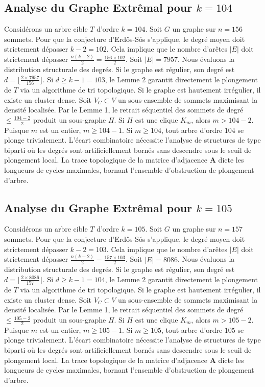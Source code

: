 \documentclass[11pt,a4paper]{article}
\begin{document}
\subsection{Analyse du Graphe Extr\^emal pour $k=104$}
Consid\'erons un arbre cible $T$ d'ordre $k=104$.
Soit $G$ un graphe sur $n=156$ sommets.
Pour que la conjecture d'Erd\H{o}s-S\'os s'applique, le degr\'e moyen doit strictement d\'epasser $k-2 = 102$.
Cela implique que le nombre d'ar\^etes $|E|$ doit strictement d\'epasser $\frac{n(k-2)}{2} = \frac{156 \times 102}{2}$.
Soit $|E| = 7957$.
Nous \'evaluons la distribution structurale des degr\'es. Si le graphe est r\'egulier, son degr\'e est $d = \lfloor \frac{2 \times 7957}{156} \rfloor$.
Si $d \geq k-1 = 103$, le Lemme 2 garantit directement le plongement de $T$ via un algorithme de tri topologique.
Si le graphe est hautement irr\'egulier, il existe un cluster dense. Soit $V_C \subset V$ un sous-ensemble de sommets maximisant la densit\'e localis\'ee.
Par le Lemme 1, le retrait s\'equentiel des sommets de degr\'e $\leq \frac{104-2}{2}$ produit un sous-graphe $H$.
Si $H$ est une clique $K_{m}$, alors $m > 104-2$. Puisque $m$ est un entier, $m \geq 104-1$. Si $m \geq 104$, tout arbre d'ordre $104$ se plonge trivialement.
L'\'ecart combinatoire n\'ecessite l'analyse de structures de type biparti o\`u les degr\'es sont artificiellement born\'es sans descendre sous le seuil de plongement local. La trace topologique de la matrice d'adjacence $\mathbf{A}$ dicte les longueurs de cycles maximales, bornant l'ensemble d'obstruction de plongement d'arbre.


\subsection{Analyse du Graphe Extr\^emal pour $k=105$}
Consid\'erons un arbre cible $T$ d'ordre $k=105$.
Soit $G$ un graphe sur $n=157$ sommets.
Pour que la conjecture d'Erd\H{o}s-S\'os s'applique, le degr\'e moyen doit strictement d\'epasser $k-2 = 103$.
Cela implique que le nombre d'ar\^etes $|E|$ doit strictement d\'epasser $\frac{n(k-2)}{2} = \frac{157 \times 103}{2}$.
Soit $|E| = 8086$.
Nous \'evaluons la distribution structurale des degr\'es. Si le graphe est r\'egulier, son degr\'e est $d = \lfloor \frac{2 \times 8086}{157} \rfloor$.
Si $d \geq k-1 = 104$, le Lemme 2 garantit directement le plongement de $T$ via un algorithme de tri topologique.
Si le graphe est hautement irr\'egulier, il existe un cluster dense. Soit $V_C \subset V$ un sous-ensemble de sommets maximisant la densit\'e localis\'ee.
Par le Lemme 1, le retrait s\'equentiel des sommets de degr\'e $\leq \frac{105-2}{2}$ produit un sous-graphe $H$.
Si $H$ est une clique $K_{m}$, alors $m > 105-2$. Puisque $m$ est un entier, $m \geq 105-1$. Si $m \geq 105$, tout arbre d'ordre $105$ se plonge trivialement.
L'\'ecart combinatoire n\'ecessite l'analyse de structures de type biparti o\`u les degr\'es sont artificiellement born\'es sans descendre sous le seuil de plongement local. La trace topologique de la matrice d'adjacence $\mathbf{A}$ dicte les longueurs de cycles maximales, bornant l'ensemble d'obstruction de plongement d'arbre.
\end{document}
